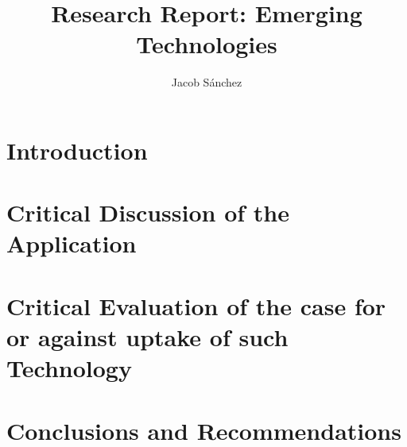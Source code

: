 \documentclass[a4paper,12pt]{article}
\title{Research Report: Emerging Technologies}
\author{Jacob Sánchez}
\date{}
\begin{document}
\maketitle


\section{Introduction}
\section{Critical Discussion of the Application}
\section{Critical Evaluation of the case for or against uptake of such Technology}
\section{Conclusions and Recommendations}

\printbibliography
\end{document}

